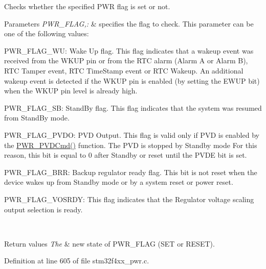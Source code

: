 Checks whether the specified P\-W\-R flag is set or not. 


\begin{DoxyParams}{Parameters}
{\em P\-W\-R\-\_\-\-F\-L\-A\-G,\-:} & specifies the flag to check. This parameter can be one of the following values\-: \begin{DoxyItemize}
\item P\-W\-R\-\_\-\-F\-L\-A\-G\-\_\-\-W\-U\-: Wake Up flag. This flag indicates that a wakeup event was received from the W\-K\-U\-P pin or from the R\-T\-C alarm (Alarm A or Alarm B), R\-T\-C Tamper event, R\-T\-C Time\-Stamp event or R\-T\-C Wakeup. An additional wakeup event is detected if the W\-K\-U\-P pin is enabled (by setting the E\-W\-U\-P bit) when the W\-K\-U\-P pin level is already high. \item P\-W\-R\-\_\-\-F\-L\-A\-G\-\_\-\-S\-B\-: Stand\-By flag. This flag indicates that the system was resumed from Stand\-By mode. \item P\-W\-R\-\_\-\-F\-L\-A\-G\-\_\-\-P\-V\-D\-O\-: P\-V\-D Output. This flag is valid only if P\-V\-D is enabled by the \hyperlink{group___p_w_r___exported___constants_ga42cad476b816e0a33594a933b3ed1acd}{P\-W\-R\-\_\-\-P\-V\-D\-Cmd()} function. The P\-V\-D is stopped by Standby mode For this reason, this bit is equal to 0 after Standby or reset until the P\-V\-D\-E bit is set. \item P\-W\-R\-\_\-\-F\-L\-A\-G\-\_\-\-B\-R\-R\-: Backup regulator ready flag. This bit is not reset when the device wakes up from Standby mode or by a system reset or power reset. \item P\-W\-R\-\_\-\-F\-L\-A\-G\-\_\-\-V\-O\-S\-R\-D\-Y\-: This flag indicates that the Regulator voltage scaling output selection is ready. \end{DoxyItemize}
\\
\hline
\end{DoxyParams}

\begin{DoxyRetVals}{Return values}
{\em The} & new state of P\-W\-R\-\_\-\-F\-L\-A\-G (S\-E\-T or R\-E\-S\-E\-T). \\
\hline
\end{DoxyRetVals}


Definition at line 605 of file stm32f4xx\-\_\-pwr.\-c.


